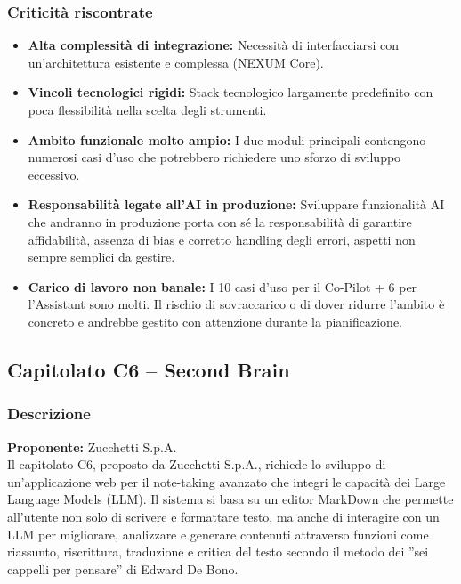 \documentclass{article}
\begin{document}
	\subsubsection{Criticità riscontrate}
	\begin{itemize}
		\item \textbf{Alta complessità di integrazione:} Necessità di interfacciarsi con un'architettura esistente e complessa (NEXUM Core).
		\item \textbf{Vincoli tecnologici rigidi:} Stack tecnologico largamente predefinito con poca flessibilità nella scelta degli strumenti.
		\item \textbf{Ambito funzionale molto ampio: }  I due moduli principali contengono numerosi casi d'uso che potrebbero richiedere uno sforzo di sviluppo eccessivo.
        \item \textbf{Responsabilità legate all'AI in produzione:} Sviluppare funzionalità AI che andranno in produzione porta con sé la responsabilità di garantire affidabilità, assenza di bias e corretto handling degli errori, aspetti non sempre semplici da gestire.
        \item \textbf{Carico di lavoro non banale:} I 10 casi d'uso per il Co-Pilot + 6 per l'Assistant sono molti. Il rischio di sovraccarico o di dover ridurre l'ambito è concreto e andrebbe gestito con attenzione durante la pianificazione.
    \end{itemize}
	
	\subsection{Capitolato C6 – Second Brain}
	\subsubsection{Descrizione}
    \textbf{Proponente:} Zucchetti S.p.A.\\
	Il capitolato C6, proposto da Zucchetti S.p.A., richiede lo sviluppo di un'applicazione web per il note-taking avanzato che integri le capacità dei Large Language Models (LLM). Il sistema si basa su un editor MarkDown che permette all'utente non solo di scrivere e formattare testo, ma anche di interagire con un LLM per migliorare, analizzare e generare contenuti attraverso funzioni come riassunto, riscrittura, traduzione e critica del testo secondo il metodo dei ''sei cappelli per pensare'' di Edward De Bono.
	
\end{document}
